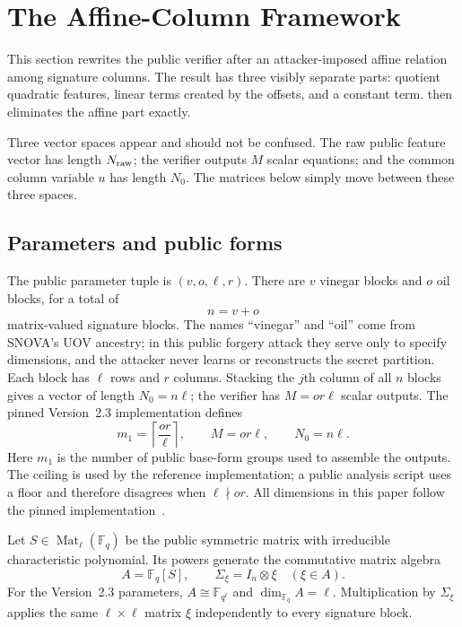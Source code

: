 \documentclass[11pt]{article}
\newcommand{\F}{\mathbb F}
\newcommand{\Mat}{\operatorname{Mat}}
\begin{document}
\section{The Affine-Column Framework}\label{sec:prelim}

This section rewrites the public verifier after an attacker-imposed affine
relation among signature columns.  The result has three visibly separate
parts: quotient quadratic features, linear terms created by the offsets, and a
constant term.   then eliminates the affine part
exactly.

Three vector spaces appear and should not be confused.  The raw public feature
vector has length $N_{\rm raw}$; the verifier outputs $M$ scalar equations; and the
common column variable $u$ has length $N_0$.  The matrices below simply move
between these three spaces.

\subsection{Parameters and public forms}\label{sec:parameters}

The public parameter tuple is $(v,o,\ell,r)$.  There are $v$ vinegar blocks and
$o$ oil blocks, for a total of
\[
  n=v+o
\]
matrix-valued signature blocks.  The names ``vinegar'' and ``oil'' come from
SNOVA's UOV ancestry; in this public forgery attack they serve only to specify
dimensions, and the attacker never learns or reconstructs the secret partition.
Each block has $\ell$ rows and $r$ columns.
Stacking the $j$th column of all $n$ blocks gives a vector of length
$N_0=n\ell$; the verifier has $M=or\ell$ scalar outputs.  The pinned
Version~2.3 implementation defines
\begin{equation}\label{eq:parameters-basic}
 m_1=\left\lceil\frac{or}{\ell}\right\rceil,
 \qquad M=or\ell,
 \qquad N_0=n\ell.
\end{equation}
Here $m_1$ is the number of public base-form groups used to assemble the
outputs.  The ceiling is used by the reference implementation; a public
analysis script uses a floor and therefore disagrees when $\ell\nmid or$.  All
dimensions in this paper follow the pinned implementation~\cite{SNOVA23}.

Let $S\in\Mat_\ell(\F_q)$ be the public symmetric matrix with irreducible
characteristic polynomial.  Its powers generate the commutative matrix
algebra
\[
 A=\F_q[S],\qquad \Sigma_\xi=I_n\otimes\xi\quad(\xi\in A).
\]
For the Version~2.3 parameters, $A\cong\F_{q^\ell}$ and
$\dim_{\F_q}A=\ell$.  Multiplication by $\Sigma_\xi$ applies the same
$\ell\times\ell$ matrix $\xi$ independently to every signature block.
\end{document}
